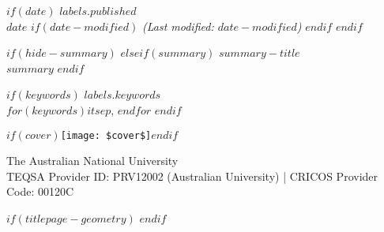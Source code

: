 \begin{minipage}[b][\textheight][s]{\textwidth}
\begin{titlepagebox}

$if(date)$
{\textcolor{anugold}{\MakeUppercase{$labels.published$}}}\\ $date$
$if(date-modified)$
{\itshape{(Last modified: $date-modified$)}}
$endif$
\vspace{3mm}
$endif$

$if(hide-summary)$
$elseif(summary)$
\textcolor{anugold}{\MakeUppercase{$summary-title$}}\\
$summary$
$endif$
\vspace{3mm}

$if(keywords)$
{\textcolor{anugold}{\MakeUppercase{$labels.keywords$}}}\\
$for(keywords)$$it$$sep$, $endfor$
$endif$

\end{titlepagebox}

\vspace{2\baselineskip}






\vfill

$if(cover)$\texttt{[image: \$cover\$]}$endif$

\vspace{1\baselineskip}

The Australian National University\\{\footnotesize TEQSA Provider ID: PRV12002 (Australian University) | CRICOS Provider Code: 00120C}

\end{minipage}
$if(titlepage-geometry)$
\restoregeometry
$endif$
